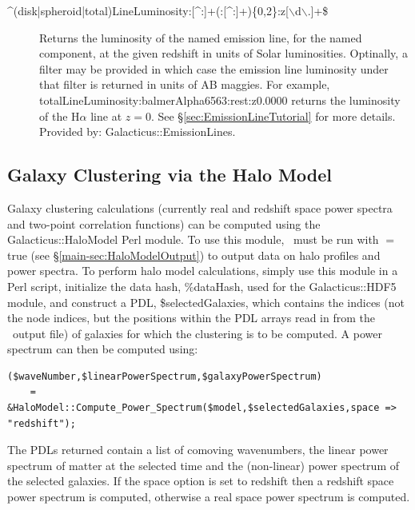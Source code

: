 \begin{description}
 \item[{\normalfont \ttfamily \textasciicircum (disk|spheroid|total)LineLuminosity:[\textasciicircum:]+(:[\textasciicircum:]+)\{0,2\}:z[$\backslash$d$\backslash$.]+\$}] Returns the luminosity of the named emission line, for the named component, at the given redshift in units of Solar luminosities. Optinally, a filter may be provided in which case the emission line luminosity under that filter is returned in units of AB \glspl{maggie}. For example, {\normalfont \ttfamily totalLineLuminosity:balmerAlpha6563:rest:z0.0000} returns the luminosity of the H$\alpha$ line at $z=0$. See \S\ref{sec:EmissionLineTutorial} for more details. Provided by: {\normalfont \ttfamily Galacticus::EmissionLines}. 
\end{description}

\subsection{Galaxy Clustering via the Halo Model}\label{sec:ClusteringHaloModel}

Galaxy clustering calculations (currently real and redshift space power spectra and two-point correlation functions) can be computed using the {\normalfont \ttfamily Galacticus::HaloModel} Perl module. To use this module, \glc\ must be run with {\normalfont \ttfamily [outputHaloModelData]}$=${\normalfont \ttfamily true} (see \S\ref{main-sec:HaloModelOutput}) to output data on halo profiles and power spectra. To perform halo model calculations, simply use this module in a Perl script, initialize the data hash, {\normalfont \ttfamily \%dataHash}, used for the {\normalfont \ttfamily Galacticus::HDF5} module, and construct a PDL, {\normalfont \ttfamily \$selectedGalaxies}, which contains the indices (not the node indices, but the positions within the PDL arrays read in from the \glc\ output file) of galaxies for which the clustering is to be computed. A power spectrum can then be computed using:
\begin{verbatim}
($waveNumber,$linearPowerSpectrum,$galaxyPowerSpectrum) 
    = &HaloModel::Compute_Power_Spectrum($model,$selectedGalaxies,space => "redshift");
\end{verbatim}
The PDLs returned contain a list of comoving wavenumbers, the linear power spectrum of matter at the selected time and the (non-linear) power spectrum of the selected galaxies. If the {\normalfont \ttfamily space} option is set to {\normalfont \ttfamily redshift} then a redshift space power spectrum is computed, otherwise a real space power spectrum is computed.

